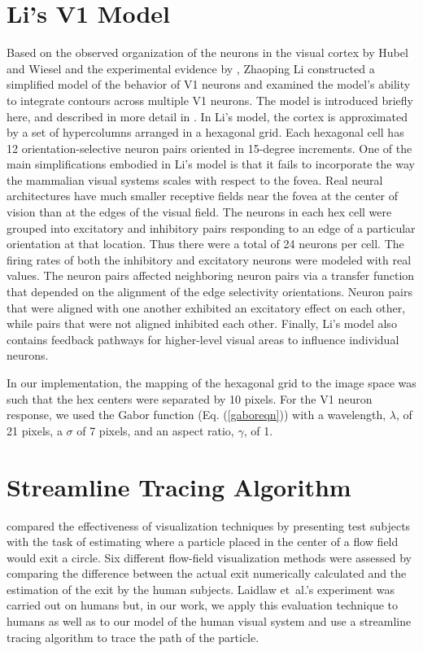 \documentclass[prodmode,acmtap]{acmlarge}
\begin{document}
\section{Li's V1 Model}
Based on the observed organization of the neurons in the visual
cortex by Hubel and Wiesel \citeyear{Hubel1962,Hubel1968} and the
experimental evidence by , Zhaoping Li constructed a
simplified model of the behavior of V1 neurons and examined the
model's ability to integrate contours across multiple V1 neurons.
The model is introduced briefly here, and described in more detail in
. In Li's model, the cortex is approximated by a set
of hypercolumns arranged in a hexagonal grid. Each hexagonal cell has
12 orientation-selective neuron pairs oriented in 15-degree
increments. One of the main simplifications embodied in Li's model is
that it fails to incorporate the way the mammalian visual systems
scales with respect to the fovea. Real neural architectures have much
smaller receptive fields near the fovea at the center of vision than
at the edges of the visual field.
The neurons in each hex cell were grouped into excitatory and
inhibitory pairs responding to an edge of a particular orientation at
that location. Thus there were a total of 24 neurons per cell. The
firing rates of both the inhibitory and excitatory neurons were
modeled with real values. The neuron pairs affected neighboring
neuron pairs via a transfer function that depended on the alignment
of the edge selectivity orientations. Neuron pairs that were aligned
with one another exhibited an excitatory effect on each other, while
pairs that were not aligned inhibited each other. Finally, Li's model
also contains feedback pathways for higher-level visual areas to
influence individual neurons.

In our implementation, the mapping of the hexagonal grid to the image
space was such that the hex centers were separated by 10 pixels. For
the V1 neuron response, we used the Gabor function (Eq.
(\ref{gaboreqn})) with a wavelength, $\lambda$, of 21 pixels, a
$\sigma$ of 7 pixels, and an aspect ratio, $\gamma$, of 1.

\section{Streamline Tracing Algorithm}
 compared the effectiveness of
visualization techniques by presenting test subjects with the task of
estimating where a particle placed in the center of a flow field
would exit a circle. Six different flow-field visualization methods
were assessed by comparing the difference between the actual exit
numerically calculated and the estimation of the exit by the human
subjects. Laidlaw et~al.'s experiment was carried out on humans but,
in our work, we apply this evaluation technique to humans as well as
to our model of the human visual system and use a streamline tracing
algorithm to trace the path of the particle.
\end{document}
